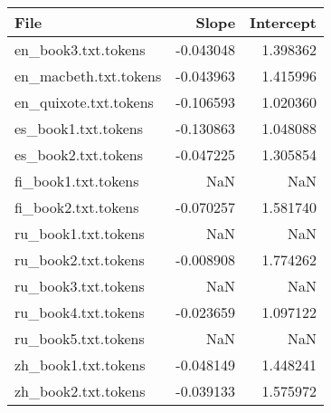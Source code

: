 \begin{tabular}{lrr}
\toprule
File & Slope & Intercept \\
\midrule
en_book3.txt.tokens & -0.043048 & 1.398362 \\
en_macbeth.txt.tokens & -0.043963 & 1.415996 \\
en_quixote.txt.tokens & -0.106593 & 1.020360 \\
es_book1.txt.tokens & -0.130863 & 1.048088 \\
es_book2.txt.tokens & -0.047225 & 1.305854 \\
fi_book1.txt.tokens & NaN & NaN \\
fi_book2.txt.tokens & -0.070257 & 1.581740 \\
ru_book1.txt.tokens & NaN & NaN \\
ru_book2.txt.tokens & -0.008908 & 1.774262 \\
ru_book3.txt.tokens & NaN & NaN \\
ru_book4.txt.tokens & -0.023659 & 1.097122 \\
ru_book5.txt.tokens & NaN & NaN \\
zh_book1.txt.tokens & -0.048149 & 1.448241 \\
zh_book2.txt.tokens & -0.039133 & 1.575972 \\
\bottomrule
\end{tabular}
